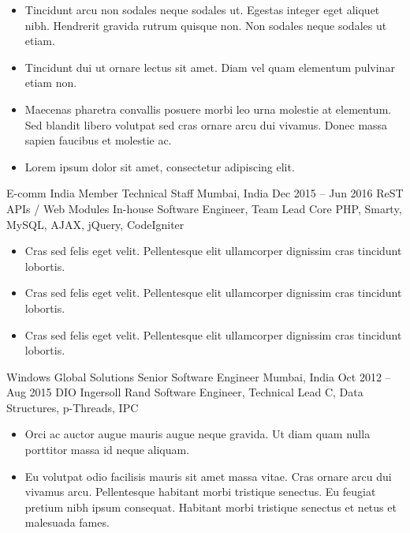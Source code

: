 \documentclass[10pt, a4paper]{cvhari}
\begin{document}
        \begin{itemize}
            \item  Tincidunt arcu non sodales neque sodales ut. Egestas integer eget aliquet nibh. Hendrerit gravida rutrum quisque non. Non sodales neque sodales ut etiam. \smallskip
            \item  Tincidunt dui ut ornare lectus sit amet. Diam vel quam elementum pulvinar etiam non. \smallskip
            \item  Maecenas pharetra convallis posuere morbi leo urna molestie at elementum. Sed blandit libero volutpat sed cras ornare arcu dui vivamus. Donec massa sapien faucibus et molestie ac.\smallskip
            \item  Lorem ipsum dolor sit amet, consectetur adipiscing elit. \smallskip
        \end{itemize}

\smallskip
\divider
\smallskip

    \company
        {E-comm India}
        {Member Technical Staff}
        {Mumbai, India}
        {Dec 2015 – Jun 2016}
        \project
        {ReST APIs / Web Modules}
        {In-house}
        {Software Engineer, Team Lead}
        {Core PHP, Smarty, MySQL, AJAX, jQuery, CodeIgniter}
        
        \begin{itemize}
            \item Cras sed felis eget velit. Pellentesque elit ullamcorper dignissim cras tincidunt lobortis. \smallskip
            \item Cras sed felis eget velit. Pellentesque elit ullamcorper dignissim cras tincidunt lobortis. \smallskip
            \item Cras sed felis eget velit. Pellentesque elit ullamcorper dignissim cras tincidunt lobortis. \smallskip
        \end{itemize}

\smallskip
\divider
\smallskip

    \company
        {Windows Global Solutions}
        {Senior Software Engineer}
        {Mumbai, India}
        {Oct 2012 – Aug 2015}
        \project
        {DIO}
        {Ingersoll Rand}
        {Software Engineer, Technical Lead}
        {C, Data Structures, p-Threads, IPC}
        
        \begin{itemize}
            \item  Orci ac auctor augue mauris augue neque gravida. Ut diam quam nulla porttitor massa id neque aliquam.\smallskip
            \item Eu volutpat odio facilisis mauris sit amet massa vitae. Cras ornare arcu dui vivamus arcu. Pellentesque habitant morbi tristique senectus. Eu feugiat pretium nibh ipsum consequat. Habitant morbi tristique senectus et netus et malesuada fames.\smallskip
        \end{itemize}
        
\end{document}
